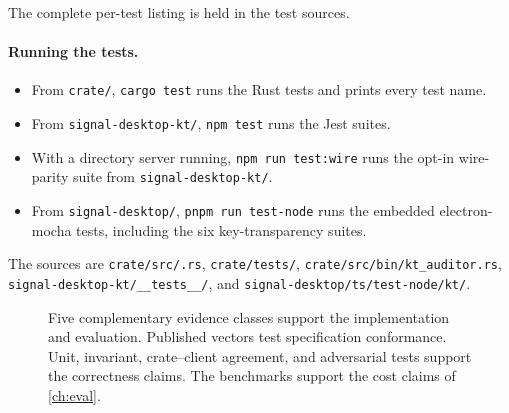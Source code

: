 The complete per-test listing is held in the test sources.

\paragraph{Running the tests.}
\begin{itemize}
  \item From \texttt{crate/}, \texttt{cargo test} runs the Rust tests and prints every test name.
  \item From \texttt{signal-desktop-kt/}, \texttt{npm test} runs the Jest suites.
  \item With a directory server running, \texttt{npm run test:wire} runs the opt-in wire-parity
  suite from \texttt{signal-desktop-kt/}.
  \item From \texttt{signal-desktop/}, \texttt{pnpm run test-node} runs the embedded
  electron-mocha tests, including the six key-transparency suites.
\end{itemize}

The sources are \texttt{crate/\allowbreak src/\allowbreak *.rs},
\texttt{crate/\allowbreak tests/},
\texttt{crate/\allowbreak src/\allowbreak bin/\allowbreak kt\_auditor.rs},
\texttt{signal-desktop-kt/\allowbreak \_\_tests\_\_/}, and
\texttt{signal-desktop/\allowbreak ts/\allowbreak test-node/\allowbreak kt/}.

\begin{figure}[ht]
\centering

\caption[The evidence classes.]{Five complementary evidence classes support the implementation and
evaluation. Published vectors test specification conformance. Unit, invariant, crate--client
agreement, and adversarial tests support the correctness claims. The benchmarks support the cost
claims of \cref{ch:eval}.}
\label{fig:impl-testing}
\end{figure}

